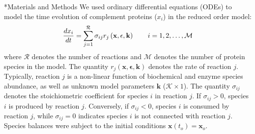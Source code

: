 \documentclass[12pt]{article}
\makeatletter
\renewcommand\section{\@startsection
	{subsection}{2}{0mm}
	{-0.2in}
	{0.05\baselineskip}
	{\normalfont\large\bfseries}}
\makeatother
\begin{document}
%
%
%
%
%
%
%



\clearpage


\section*{Materials and Methods}
We used ordinary differential equations (ODEs) to model the time evolution of complement proteins ($x_{i}$) in the reduced order model:
\begin{equation}
	\frac{dx_{i}}{dt}  =  \sum_{j = 1}^{\mathcal{R}}\sigma_{ij}r_{j}\left(\mathbf{x},\mathbf{\epsilon},\mathbf{k}\right)\qquad{i=1,2,\hdots,\mathcal{M}}\\
\end{equation}
where $\mathcal{R}$ denotes the number of reactions and $\mathcal{M}$ denotes the number of protein species in the model.
The quantity $r_{j}\left(\mathbf{x},\mathbf{\epsilon},\mathbf{k}\right)$ denotes the rate of reaction $j$.
Typically, reaction $j$ is a non-linear function of biochemical and enzyme species abundance, as well as unknown model parameters $\mathbf{k}$ ($\mathcal{K}\times{1}$).
The quantity $\sigma_{ij}$ denotes the stoichiometric coefficient for species $i$ in reaction $j$.
If $\sigma_{ij}>0$, species $i$ is produced by reaction $j$.
Conversely, if $\sigma_{ij}<0$, species $i$ is consumed by reaction $j$, while $\sigma_{ij} = 0$ indicates species $i$ is not connected with reaction $j$.
Species balances were subject to the initial conditions $\mathbf{x}\left(t_{o}\right) = \mathbf{x}_{o}$.
\end{document}

